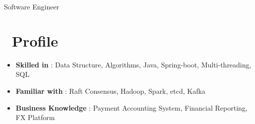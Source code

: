 \documentclass{resume}
\begin{document}

\centerline{Software Engineer}
\vspace{2ex}

\section{\faCogs\ Profile}
\begin{itemize}[parsep=0.5ex]
  \item \textbf{Skilled in} : Data Structure, Algorithms, Java, Spring-boot, Multi-threading, SQL
  \item \textbf{Familiar with} : Raft Consensus, Hadoop, Spark, etcd, Kafka
  \item \textbf{Business Knowledge} : Payment Accounting System, Financial Reporting, FX Platform
\end{itemize}
\end{document}
